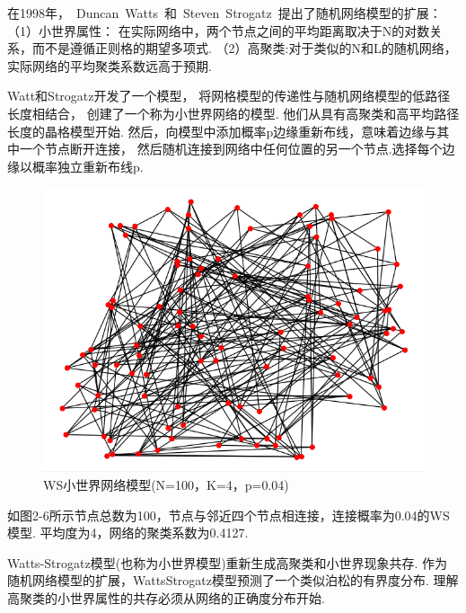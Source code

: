 \documentclass[bachelor,adobefonts]{jnuthesis}
\begin{document}
在1998年，\ Duncan\ Watts\ 和\ Steven\  Strogatz\ 提出了随机网络模型的扩展\cite{Watts1998Collectivedynamics}：
（1）小世界属性：
在实际网络中，两个节点之间的平均距离取决于N的对数关系，而不是遵循正则格的期望多项式. 
（2）高聚类:对于类似的N和L的随机网络，实际网络的平均聚类系数远高于预期.

Watt和Strogatz开发了一个模型，
将网格模型的传递性与随机网络模型的低路径长度相结合，
创建了一个称为小世界网络的模型.
他们从具有高聚类和高平均路径长度的晶格模型开始.
然后，向模型中添加概率p边缘重新布线，意味着边缘与其中一个节点断开连接，
然后随机连接到网络中任何位置的另一个节点.选择每个边缘以概率独立重新布线p.


\begin{figure}[h!]
  \centering
  \includegraphics[width=0.6\linewidth]{WWS.png}
  \caption{WS小世界网络模型(N=100，K=4，p=0.04)}
\end{figure}

如图2-6所示节点总数为100，节点与邻近四个节点相连接，连接概率为0.04的WS模型.
平均度为4，网络的聚类系数为0.4127.

Watts-Strogatz模型(也称为小世界模型)重新生成高聚类和小世界现象共存.
作为随机网络模型的扩展，WattsStrogatz模型预测了一个类似泊松的有界度分布.
理解高聚类的小世界属性的共存必须从网络的正确度分布开始.


\end{document}
